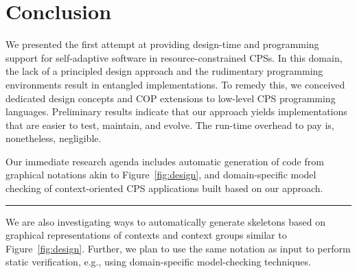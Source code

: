 \section{Conclusion}
\label{sec:ending}

We presented the first attempt at providing design-time and
programming support for self-adaptive software in
re\-sour\-ce-constrained CPSs. In this domain, the lack of a
principled design approach and the rudimentary programming
environments result in entangled implementations. To remedy this, we
conceived dedicated design concepts and COP extensions to low-level
CPS programming languages. Preliminary results indicate that our
approach yields implementations that are easier to test,
maintain, and evolve. The run-time overhead to pay is, nonetheless,
negligible.

Our immediate research agenda includes automatic generation of \conesc
code from graphical notations akin to Figure~\ref{fig:design}, and
domain-specific model checking of context-oriented CPS applications
built based on our approach.

\hrule

We
are also investigating ways to automatically generate \conesc
skeletons based on graphical representations of contexts and context
groups similar to Figure~\ref{fig:design}. Further, we plan to use the
same notation as input to perform static verification, e.g., using
domain-specific model-checking techniques.

